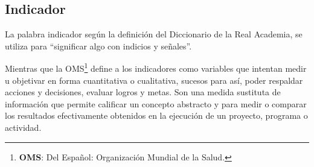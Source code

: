 \subsection{Indicador}
La palabra indicador seg\'un la definici\'on del Diccionario de la Real Academia, se utiliza para ``significar algo con indicios y se\~nales''.\cite{Espanola}

Mientras que la OMS\footnote{\textbf{OMS}: Del Espa\~nol:  Organizaci\'on Mundial de la Salud.}  define a los indicadores como variables que intentan medir u objetivar en forma cuantitativa o cualitativa, sucesos para as\'i, poder respaldar acciones y decisiones, evaluar logros y metas. Son una medida sustituta de informaci\'on que permite calificar un concepto abstracto y para medir o comparar los resultados efectivamente obtenidos en la ejecuci\'on de un proyecto, programa o actividad.\cite{OMS1981}

\newpage